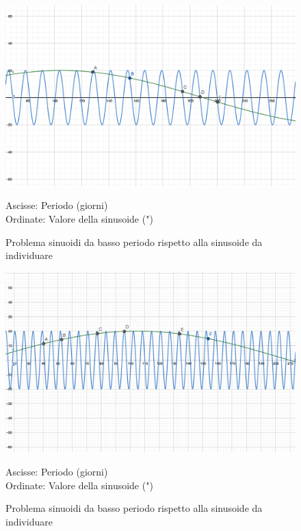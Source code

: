\documentclass[a4paper,12pt]{report}
\begin{document}
\begin{figure}[H]

  \caption{Problema sinuoidi da basso periodo rispetto alla sinusoide da individuare}
  \begin{center}
  \includegraphics[scale=0.05]{img/bassoperiodo1.png}
  \end{center}
    Ascisse: Periodo (giorni) \\ Ordinate: Valore della sinusoide (")
  \label{fig:bassoperiodo1}
\end{figure}

\begin{figure}[H]
  \caption{Problema sinuoidi da basso periodo rispetto alla sinusoide da individuare}
  \begin{center}
  \includegraphics[scale=0.05]{img/bassoperiodo3.png}
  \end{center}
    Ascisse: Periodo (giorni) \\ Ordinate: Valore della sinusoide (")
  \label{fig:bassoperiodo3}
\end{figure}
\end{document}
